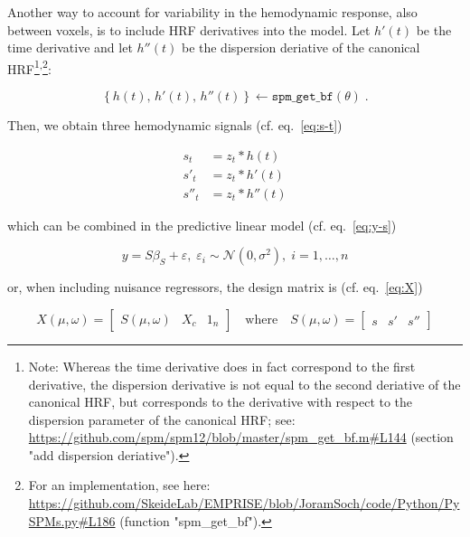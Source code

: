 \documentclass[a4paper,12pt]{article}
\begin{document}
Another way to account for variability in the hemodynamic response, also between voxels, is to include HRF derivatives into the model. Let $h'(t)$ be the time derivative and let $h''(t)$ be the dispersion deriative of the canonical HRF\footnote{Note: Whereas the time derivative does in fact correspond to the first derivative, the dispersion derivative is not equal to the second deriative of the canonical HRF, but corresponds to the derivative with respect to the dispersion parameter of the canonical HRF; see: \url{https://github.com/spm/spm12/blob/master/spm_get_bf.m#L144} (section "add dispersion deriative").}\textsuperscript{,}\footnote{For an implementation, see here: \url{https://github.com/SkeideLab/EMPRISE/blob/JoramSoch/code/Python/PySPMs.py#L186} (function "spm\_get\_bf").}:

\begin{equation} \label{eq:dHRF}
\left\lbrace h(t), \, h'(t), \, h''(t) \right\rbrace \leftarrow \mathtt{spm\_get\_bf}(\theta) \; .
\end{equation}

Then, we obtain three hemodynamic signals (cf. eq.~\ref{eq:s-t})

\vspace{-0.5em}
\begin{equation} \label{eq:s-ds-d2s-t}
\begin{split}
s_t &= z_t \ast h(t) \\
s'_t &= z_t \ast h'(t) \\
s''_t &= z_t \ast h''(t)
\end{split}
\end{equation}

which can be combined in the predictive linear model (cf. eq.~\ref{eq:y-s})

\begin{equation} \label{eq:y-S}
y = S \beta_S + \varepsilon, \; \varepsilon_i \sim \mathcal{N}(0, \sigma^2), \; i = 1,\ldots,n
\end{equation}

\pagebreak
or, when including nuisance regressors, the design matrix is (cf. eq.~\ref{eq:X})

\begin{equation} \label{eq:X-S}
X(\mu,\omega) = \left[ \begin{matrix} S(\mu,\omega) & X_c & 1_n \end{matrix} \right] \quad \text{where} \quad S(\mu,\omega) = \left[ \begin{matrix} s & s' & s'' \end{matrix} \right]
\end{equation}
\end{document}
